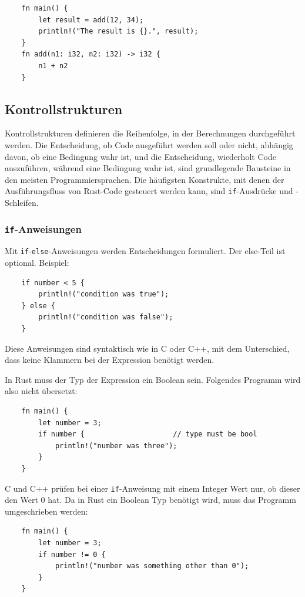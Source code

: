 \begin{lstlisting}
    fn main() {
        let result = add(12, 34);
        println!("The result is {}.", result);
    }
    fn add(n1: i32, n2: i32) -> i32 {
        n1 + n2
    }
\end{lstlisting}

\subsection{Kontrollstrukturen}

Kontrollstrukturen definieren die Reihenfolge, in der Berechnungen durchgeführt werden. Die Entscheidung, ob Code ausgeführt werden soll oder nicht, abhängig davon, ob eine Bedingung wahr ist, und die Entscheidung, wiederholt Code aus\-zu\-füh\-ren, während eine Bedingung wahr ist, sind grundlegende Bausteine in den meisten Programmiersprachen. Die häufigsten Konstrukte, mit denen der Ausführungsfluss von Rust-Code gesteuert werden kann, sind \verb"if"-Ausdrücke und -Schleifen.

\subsubsection{\texttt{if}-Anweisungen}

Mit \verb"if"-\verb"else"-Anweisungen werden Entscheidungen formuliert. Der else-Teil ist optional. Beispiel:

\begin{lstlisting}
    if number < 5 {
        println!("condition was true");
    } else {
        println!("condition was false");
    }
\end{lstlisting}

Diese Anweisungen sind syntaktisch wie in C oder C++, mit dem Unterschied, dass keine Klammern bei der Expression benötigt werden.

In Rust muss der Typ der Expression ein Boolean sein. Folgendes Programm wird also nicht übersetzt:

\begin{lstlisting}
    fn main() {
        let number = 3;
        if number {                     // type must be bool
            println!("number was three");
        }
    }
\end{lstlisting}

C und C++ prüfen bei einer \verb"if"-Anweisung mit einem Integer Wert nur, ob dieser den Wert 0 hat. Da in Rust ein Boolean Typ benötigt wird, muss das Programm umgeschrieben werden:

\begin{lstlisting}
    fn main() {
        let number = 3;
        if number != 0 {
            println!("number was something other than 0");
        }
    }
\end{lstlisting}

